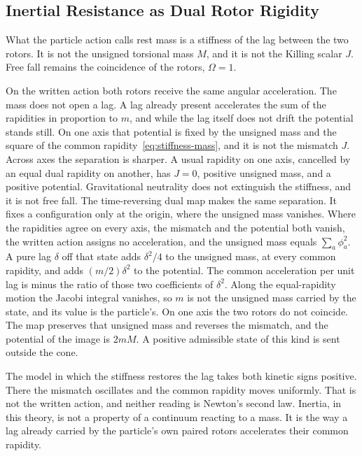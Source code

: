 \documentclass[a4paper]{article}
\begin{document}
\subsection{Inertial Resistance as Dual Rotor Rigidity}

What the particle action calls rest mass is a stiffness of the lag between the two rotors. It is not the unsigned torsional mass $M$, and it is not the Killing scalar $J$. Free fall remains the coincidence of the rotors, $\Omega=1$.

On the written action both rotors receive the same angular acceleration. The mass does not open a lag. A lag already present accelerates the sum of the rapidities in proportion to $m$, and while the lag itself does not drift the potential stands still. On one axis that potential is fixed by the unsigned mass and the square of the common rapidity~\eqref{eq:stiffness-mass}, and it is not the mismatch $J$. Across axes the separation is sharper. A usual rapidity on one axis, cancelled by an equal dual rapidity on another, has $J=0$, positive unsigned mass, and a positive potential. Gravitational neutrality does not extinguish the stiffness, and it is not free fall. The time-reversing dual map makes the same separation. It fixes a configuration only at the origin, where the unsigned mass vanishes. Where the rapidities agree on every axis, the mismatch and the potential both vanish, the written action assigns no acceleration, and the unsigned mass equals \(\sum_a\phi_a^2\). A pure lag \(\delta\) off that state adds \(\delta^2/4\) to the unsigned mass, at every common rapidity, and adds \((m/2)\delta^2\) to the potential. The common acceleration per unit lag is minus the ratio of those two coefficients of \(\delta^2\). Along the equal-rapidity motion the Jacobi integral vanishes, so \(m\) is not the unsigned mass carried by the state, and its value is the particle's. On one axis the two rotors do not coincide. The map preserves that unsigned mass and reverses the mismatch, and the potential of the image is \(2mM\). A positive admissible state of this kind is sent outside the cone.

The model in which the stiffness restores the lag takes both kinetic signs positive. There the mismatch oscillates and the common rapidity moves uniformly. That is not the written action, and neither reading is Newton's second law. Inertia, in this theory, is not a property of a continuum reacting to a mass. It is the way a lag already carried by the particle's own paired rotors accelerates their common rapidity.
\end{document}
